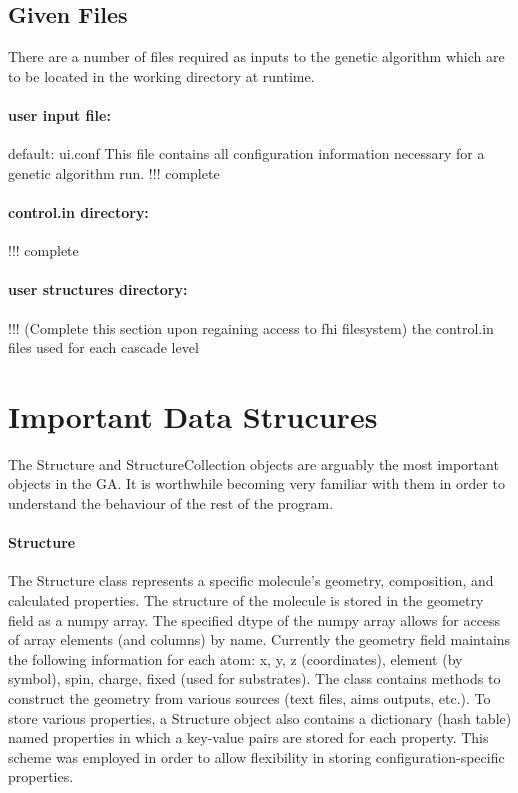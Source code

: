 \subsection{Given Files}
	There are a number of files required as inputs to the genetic algorithm which are to be located in the working directory at runtime.
	\paragraph{user input file:} 
	default: ui.conf
	This file contains all configuration information necessary for a genetic algorithm run. !!! complete
	
	\paragraph{control.in directory:} !!! complete

	\paragraph{user structures directory:}
	
	!!! (Complete this section upon regaining access to fhi filesystem)
	the control.in files used for each cascade level
	
\section{Important Data Strucures}
The Structure and StructureCollection objects are arguably the most important objects in the GA. It is worthwhile becoming very familiar with them in order to understand the behaviour of the rest of the program.

\paragraph{Structure }
The Structure class represents a specific molecule's geometry, composition, and calculated properties. The structure of the molecule is stored in the geometry field as a numpy array. The specified dtype of the numpy array allows for access of array elements (and columns) by name. Currently the geometry field maintains the following information for each atom: x, y, z (coordinates), element (by symbol), spin, charge, fixed (used for substrates).  The class contains methods to construct the geometry from various sources (text files, aims outputs, etc.). To store various properties, a Structure object also contains a dictionary (hash table) named properties in which a key-value pairs are stored for each property. This scheme was employed in order to allow flexibility in storing configuration-specific properties. 

